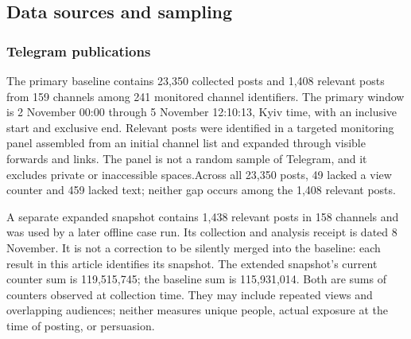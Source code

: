 \subsection{Data sources and sampling}

\subsubsection{Telegram publications}

The primary baseline contains 23,350 collected posts and 1,408 relevant posts from 159 channels among 241 monitored channel identifiers. The primary window is 2 November 00:00 through 5 November 12:10:13, Kyiv time, with an inclusive start and exclusive end. Relevant posts were identified in a targeted monitoring panel assembled from an initial channel list and expanded through visible forwards and links. The panel is not a random sample of Telegram, and it excludes private or inaccessible spaces.Across all 23,350 posts, 49 lacked a view counter and 459 lacked text; neither gap occurs among the 1,408 relevant posts.

A separate expanded snapshot contains 1,438 relevant posts in 158 channels and was used by a later offline case run. Its collection and analysis receipt is dated 8 November. It is not a correction to be silently merged into the baseline: each result in this article identifies its snapshot. The extended snapshot's current counter sum is 119,515,745; the baseline sum is 115,931,014. Both are sums of counters observed at collection time. They may include repeated views and overlapping audiences; neither measures unique people, actual exposure at the time of posting, or persuasion.

